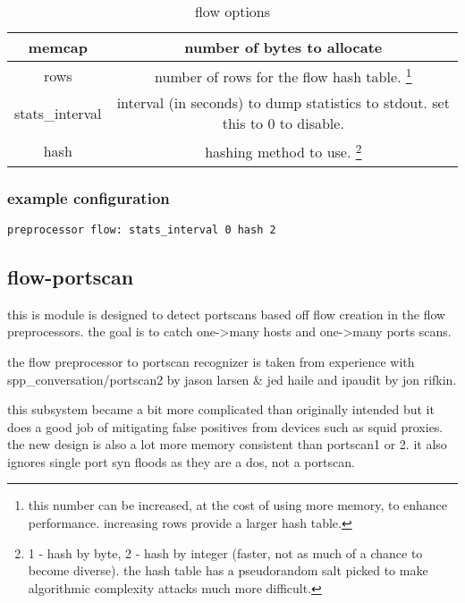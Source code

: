 \documentclass[english]{report}
\begin{document}
\begin{table}[!hbpt]
\caption{flow options}
\begin{center}\begin{tabular}{|c|c|}
\hline 
memcap &
number of bytes to allocate\\
\hline
\hline 
rows & number of rows for the flow hash table. \footnote{this number can be increased, at the cost of using more memory, to enhance performance. increasing rows provide a larger hash table.}\\
\hline 
stats\_interval &
interval (in seconds) to dump statistics to stdout. set this to 0 to disable.\\
\hline 
hash & hashing method to use.  \footnote{1 - hash by byte, 2 - hash by integer (faster, not as much of a chance to become diverse).  the hash table has a pseudorandom salt picked to make algorithmic complexity attacks much more difficult. } \\
\hline
\end{tabular}\end{center}
\end{table}

\subsubsection{example configuration}

\begin{verbatim}
preprocessor flow: stats_interval 0 hash 2
\end{verbatim}




\subsection{flow-portscan\label{sub:flow-portscan}}

this is module is designed to detect portscans based off flow creation in the
flow preprocessors.  the goal is to catch one->many hosts and one->many ports
scans.

the flow preprocessor to portscan recognizer is taken from experience with
spp\_conversation/portscan2 by jason larsen \& jed haile and ipaudit by jon
rifkin.

this subsystem became a bit more complicated than originally intended but it
does a good job of mitigating false positives from devices such as squid
proxies.  the new design is also a lot more memory consistent than portscan1 or
2.  it also ignores single port syn floods as they are a dos, not a portscan.
\end{document}
